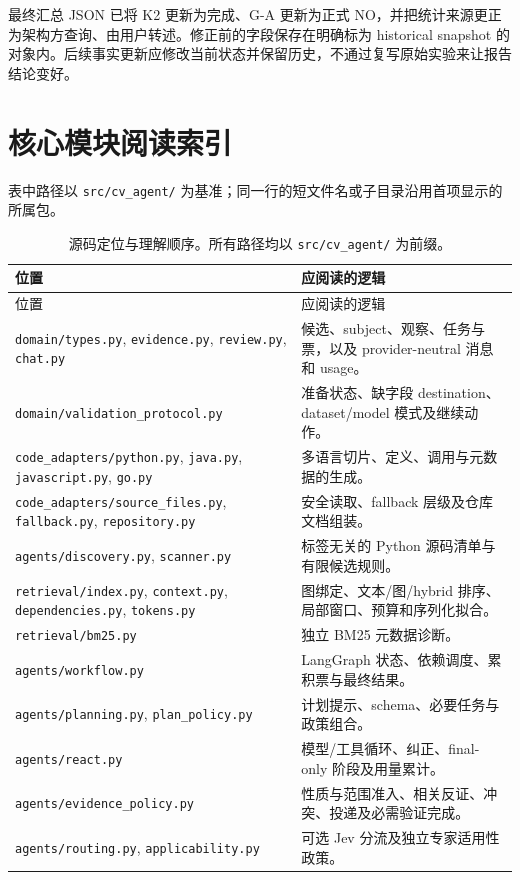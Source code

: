 \documentclass[UTF8,a4paper,zihao=-4,fontset=none]{ctexart}
\newcommand{\code}[1]{{\small\nolinkurl{#1}}}
\begin{document}
最终汇总 JSON 已将 K2 更新为完成、G-A 更新为正式 NO，并把统计来源更正为架构方查询、由用户转述。修正前的字段保存在明确标为 historical snapshot 的对象内。后续事实更新应修改当前状态并保留历史，不通过复写原始实验来让报告结论变好。

\clearpage
\appendix
\section{核心模块阅读索引}
表中路径以 \code{src/cv_agent/} 为基准；同一行的短文件名或子目录沿用首项显示的所属包。
\begin{longtable}{L{66mm}L{83mm}}
\caption{源码定位与理解顺序。所有路径均以 \code{src/cv_agent/} 为前缀。}\\
\toprule 位置 & 应阅读的逻辑\\\midrule\endfirsthead
\toprule 位置 & 应阅读的逻辑\\\midrule\endhead
\code{domain/types.py}, \code{evidence.py}, \code{review.py}, \code{chat.py} & 候选、subject、观察、任务与票，以及 provider-neutral 消息和 usage。\\
\code{domain/validation_protocol.py} & 准备状态、缺字段 destination、dataset/model 模式及继续动作。\\
\code{code_adapters/python.py}, \code{java.py}, \code{javascript.py}, \code{go.py} & 多语言切片、定义、调用与元数据的生成。\\
\code{code_adapters/source_files.py}, \code{fallback.py}, \code{repository.py} & 安全读取、fallback 层级及仓库文档组装。\\
\code{agents/discovery.py}, \code{scanner.py} & 标签无关的 Python 源码清单与有限候选规则。\\
\code{retrieval/index.py}, \code{context.py}, \code{dependencies.py}, \code{tokens.py} & 图绑定、文本/图/hybrid 排序、局部窗口、预算和序列化拟合。\\
\code{retrieval/bm25.py} & 独立 BM25 元数据诊断。\\
\code{agents/workflow.py} & LangGraph 状态、依赖调度、累积票与最终结果。\\
\code{agents/planning.py}, \code{plan_policy.py} & 计划提示、schema、必要任务与政策组合。\\
\code{agents/react.py} & 模型/工具循环、纠正、final-only 阶段及用量累计。\\
\code{agents/evidence_policy.py} & 性质与范围准入、相关反证、冲突、投递及必需验证完成。\\
\code{agents/routing.py}, \code{applicability.py} & 可选 Jev 分流及独立专家适用性政策。\\

\end{longtable}
\end{document}
